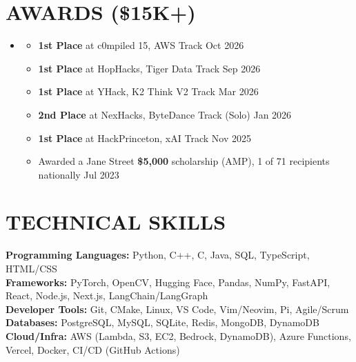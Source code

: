 \documentclass[letterpaper,11pt]{article}
\newcommand{\resumeItem}[1]{
  \item\small{
    {#1 \vspace{-4pt}}
  }
}
\newcommand{\resumeSubHeadingListStart}{\begin{itemize}[leftmargin=0.15in, label={}]}
\newcommand{\resumeSubHeadingListEnd}{\end{itemize}}
\newcommand{\resumeItemListStart}{\begin{itemize}}
\newcommand{\resumeItemListEnd}{\end{itemize}\vspace{-8pt}}
\begin{document}
\section{\textbf{AWARDS (\$15K+)}}
  \resumeSubHeadingListStart
    \item
      \resumeItemListStart
        \resumeItem{\textbf{1st Place} at c0mpiled 15, AWS Track \hfill Oct 2026}
        \resumeItem{\textbf{1st Place} at HopHacks, Tiger Data Track \hfill Sep 2026}
        \resumeItem{\textbf{1st Place} at YHack, K2 Think V2 Track \hfill Mar 2026}
        \resumeItem{\textbf{2nd Place} at NexHacks, ByteDance Track (Solo) \hfill Jan 2026}
        \resumeItem{\textbf{1st Place} at HackPrinceton, xAI Track \hfill Nov 2025}
        \resumeItem{Awarded a Jane Street \textbf{\$5,000} scholarship (AMP), 1 of 71 recipients nationally \hfill Jul 2023}
      \resumeItemListEnd
  \resumeSubHeadingListEnd

\section{\textbf{TECHNICAL SKILLS}}
 \begin{itemize}[leftmargin=0.15in, label={}, itemsep=-3pt, topsep=0pt]
    \small{\item{
     \textbf{Programming Languages:}{ Python, C++, C, Java, SQL, TypeScript, HTML/CSS} \\
     \textbf{Frameworks:}{ PyTorch, OpenCV, Hugging Face, Pandas, NumPy, FastAPI, React, Node.js, Next.js, LangChain/LangGraph} \\
     \textbf{Developer Tools:}{ Git, CMake, Linux, VS Code, Vim/Neovim, Pi, Agile/Scrum} \\
     \textbf{Databases:}{ PostgreSQL, MySQL, SQLite, Redis, MongoDB, DynamoDB} \\
     \textbf{Cloud/Infra:}{ AWS (Lambda, S3, EC2, Bedrock, DynamoDB), Azure Functions, Vercel, Docker, CI/CD (GitHub Actions)}
    }}
 \end{itemize}\vspace{-11pt}

\end{document}
